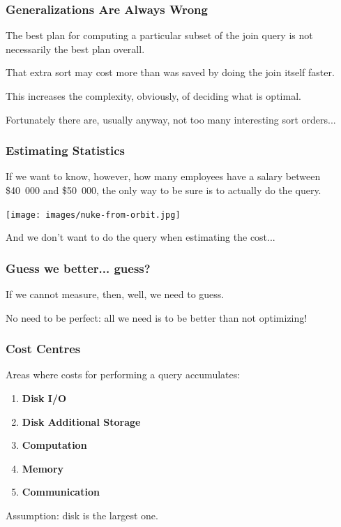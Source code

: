 \begin{frame}
\frametitle{Generalizations Are Always Wrong}

The best plan for computing a particular subset of the join query is not necessarily the best plan overall. 

That extra sort may cost more than was saved by doing the join itself faster. 

This increases the complexity, obviously, of deciding what is optimal. 

Fortunately there are, usually anyway, not too many interesting sort orders...

\end{frame}

\begin{frame}
\frametitle{Estimating Statistics}

If we want to know, however, how many employees have a salary between \$40~000 and \$50~000, the only way to be sure is to actually do the query.

\begin{center}
	\texttt{[image: images/nuke-from-orbit.jpg]}
\end{center}

And we don't want to do the query when estimating the cost...

\end{frame}


\begin{frame}
\frametitle{Guess we better... guess?}

If we cannot measure, then, well, we need to guess.

No need to be perfect: all we need is to be better than not optimizing!

\end{frame}

\begin{frame}
\frametitle{Cost Centres}

Areas where costs for performing a query accumulates:

\begin{enumerate}
	\item \textbf{Disk I/O}
	\item \textbf{Disk Additional Storage}
	\item \textbf{Computation}
	\item \textbf{Memory}
	\item \textbf{Communication}
\end{enumerate}

Assumption: disk is the largest one.

\end{frame}



